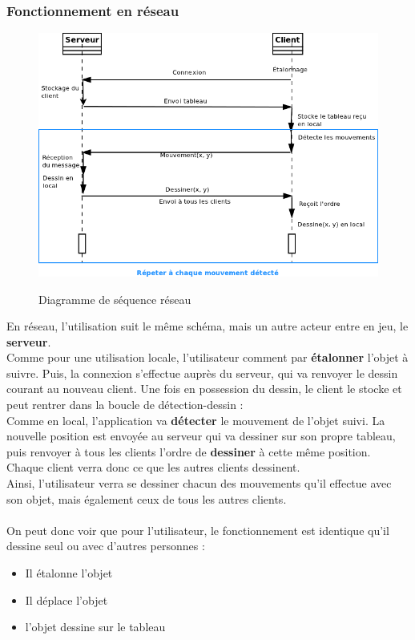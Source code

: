 \documentclass{report}
\begin{document}
				\newpage
				\subsubsection{Fonctionnement en réseau}
				\begin{figure}[!h]
						\centering
						\includegraphics[scale=0.62]{../images/sequence_reseau.png}\\
						\caption{Diagramme de séquence réseau}
						\label{Diagramme de séquence réseau}
				\end{figure}
				En réseau, l'utilisation suit le même schéma, mais un autre acteur entre en jeu, le \textbf{serveur}. \\
				Comme pour une utilisation locale, l'utilisateur comment par \textbf{étalonner} l'objet à suivre. Puis, la connexion s'effectue auprès du serveur, qui va renvoyer le dessin courant au nouveau client. Une fois en possession du dessin, le client le stocke et peut rentrer dans la boucle de détection-dessin : \\
				Comme en local, l'application va \textbf{détecter} le mouvement de l'objet suivi. La nouvelle position est envoyée au serveur qui va dessiner sur son propre tableau, puis renvoyer à tous les clients l'ordre de \textbf{dessiner} à cette même position. Chaque client verra donc ce que les autres clients dessinent. \\
				Ainsi, l'utilisateur verra se dessiner chacun des mouvements qu'il effectue avec son objet, mais également ceux de tous les autres clients.
				\\ $$$$ \\
				On peut donc voir que pour l'utilisateur, le fonctionnement est identique qu'il dessine seul ou avec d'autres personnes :
				\begin{itemize}
					\item Il étalonne l'objet
					\item Il déplace l'objet
					\item l'objet dessine sur le tableau
				\end{itemize}
				
\end{document}
